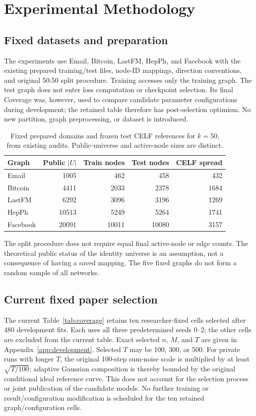 \chapter{Experimental Methodology}\label{ch:design}
\section{Fixed datasets and preparation}
The experiments use Email, Bitcoin, LastFM, HepPh, and Facebook with the existing prepared training/test files, node-ID mappings, direction conventions, and original 50:50 split procedure. Training accesses only the training graph. The test graph does not enter loss computation or checkpoint selection. Its final Coverage was, however, used to compare candidate parameter configurations during development; the retained table therefore has post-selection optimism. No new partition, graph preprocessing, or dataset is introduced.

\begin{table}[htbp]
\centering\small
\caption{Fixed prepared domains and frozen test CELF references for $k=50$, from existing audits. Public-universe and active-node sizes are distinct.}\label{tab:datasets}
\begin{tabular}{lrrrr}\toprule
Graph & Public $|U|$ & Train nodes & Test nodes & CELF spread\\\midrule
Email & 1005 & 462 & 458 & 432\\
Bitcoin & 4411 & 2033 & 2378 & 1684\\
LastFM & 6292 & 3096 & 3196 & 1269\\
HepPh & 10513 & 5249 & 5264 & 1741\\
Facebook & 20091 & 10011 & 10080 & 3157\\\bottomrule
\end{tabular}
\end{table}

The split procedure does not require equal final active-node or edge counts. The theoretical public status of the identity universe is an assumption, not a consequence of having a saved mapping. The five fixed graphs do not form a random sample of all networks.

\section{Current fixed paper selection}
The current Table~\ref{tab:coverage} retains ten researcher-fixed cells selected after 480 development fits. Each uses all three predetermined seeds 0--2; the other cells are excluded from the current table. Exact selected $n$, $M$, and $T$ are given in Appendix~\ref{app:development}. Selected $T$ may be 100, 300, or 500. For private runs with longer $T$, the original 100-step sum-noise scale is multiplied by at least $\sqrt{T/100}$; adaptive Gaussian composition is thereby bounded by the original conditional ideal reference curve. This does not account for the selection process or joint publication of the candidate models. No further training or result/configuration modification is scheduled for the ten retained graph/configuration cells.

